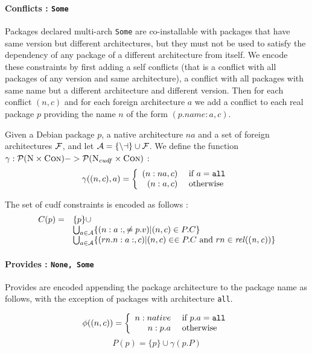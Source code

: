 \paragraph{Conflicts : \texttt{Some}}
Packages declared multi-arch \texttt{Some} are co-installable with
packages that have same version but different architectures, but they
must not be used to satisfy the dependency of any package of a
different architecture from itself. We encode these constraints by
first adding a self conflicts (that is a conflict with all packages of
any version and same architecture), a conflict with all packages with
same name but a different architecture and different version. Then for
each conflict $(n,c)$ and for each foreign architecture $a$ we add a
conflict to each real package $p$ providing the name $n$ of the form
$(p.name:a,c)$.

\begin{definition}
  Given a Debian package $p$, a native architecture $na$ and a set of
  foreign architectures $\cal{F}$, and let $\cal{A} = \{ na \}
  \cup \cal{F}$. We define the function $\gamma :
  \mathcal{P}(\textsc{N}\times\textsc{Con}) -> \mathcal{P}(\textsc{N}_{cudf}\times\textsc{Con})$ :
\[
  \gamma ((n,c),a) = \left\{ 
    \begin{array}{rl}
      (n:na,c) & \mbox{ if } a = \tt{all} \\
      (n:a,c)        &  \mbox{ otherwise }
    \end{array} 
  \right.
\]

The set of cudf constraints is encoded as follows : 
\[
  \begin{array}{rl}
    C(p) = & \{ p \} \cup \\ 
    & \bigcup_{a \in \cal{A}} \{ (n:a:, \neq p.v) | (n,c) \in P.C \}\\
    & \bigcup_{a \in \cal{A}} \{ (rn.n:a:,c) | (n,c) \in \in
    P.C \mbox{ and } rn \in \mathit{rel((n,c))} \} \\

  \end{array}
\]
\end{definition}


\paragraph{Provides : \texttt{None, Some}}

Provides are encoded appending the package architecture
to the package name as follows, with the exception of packages with
architecture \texttt{all}.

\[
  \phi ((n,c)) = \left\{ 
    \begin{array}{rl}
      n:native &  \mbox{ if } p.a = \tt{all} \\
      n:p.a & \mbox{ otherwise }
    \end{array} 
  \right.
\]
\[
  P(p) = \{ p \} \cup \gamma(p.P)
\]

